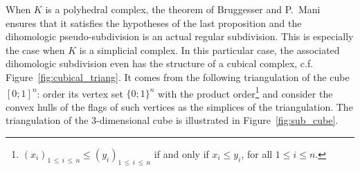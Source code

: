 \documentclass[AHL,Unicode,longabstracts,published]{cedram}
\begin{document}
When $K$ is a polyhedral complex, the theorem of Bruggesser and P.~Mani~\cite[Corollary p.~203]{Bru-Man_she_dec}
ensures that it satisfies the hypotheses of the last proposition and the dihomologic pseudo-subdivision is an actual regular subdivision. This is especially the case when $K$ is a simplicial complex. In this particular case, the associated dihomologic subdivision even has the structure of a cubical complex, c.f. Figure~\ref{fig:cubical_triang}. It comes from the following triangulation of the cube $[0;1]^n$: order its vertex set $\{0;1\}^n$ with the product order\footnote{$(x_i)_{1\,\leq\,i\,\leq \,n}\leq(y_i)_{1\,\leq\,i\,\leq\,n}$ if and only if $x_i\leq y_i$, for all $1\leq i\leq n$.} and consider the convex hulls of the flags of such vertices as the simplices of the triangulation. The triangulation of the 3-dimensional cube is illustrated in Figure~\ref{fig:sub_cube}.
\end{document}
